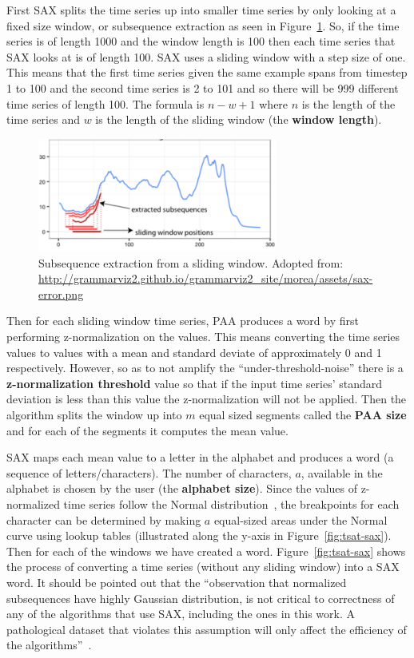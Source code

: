\documentclass[letterpaper, 12pt]{article}
\begin{document}
First SAX splits the time series up into smaller time series by only looking at a fixed size window, or subsequence extraction as seen in Figure~\ref{fig:tsat-slidingwindow}.  So, if the time series is of length 1000 and the window length is 100 then each time series that SAX looks at is of length 100.  SAX uses a sliding window with a step size of one.  This means that the first time series given the same example spans from timestep 1 to 100 and the second time series is 2 to 101 and so there will be 999 different time series of length 100.  The formula is \(n - w + 1\) where \(n\) is the length of the time series and \(w\) is the length of the sliding window (the \textbf{window length}).

\begin{figure}[H]
	\centering
	\includegraphics[width=0.7\textwidth]{pictures/TSAT-slidingwindow}
	\caption{Subsequence extraction from a sliding window.  Adopted from:\\ \url{http://grammarviz2.github.io/grammarviz2_site/morea/assets/sax-error.png}}
	\label{fig:tsat-slidingwindow}
\end{figure}


Then for each sliding window time series, PAA produces a word by first performing z-normalization on the values.  This means converting the time series values to values with a mean and standard deviate of approximately 0 and 1 respectively.  However, so as to not amplify the ``under-threshold-noise'' there is a \textbf{z-normalization threshold} value so that if the input time series' standard deviation is less than this value the z-normalization will not be applied. Then the algorithm splits the window up into \(m\) equal sized segments called the \textbf{PAA size} and for each of the segments it computes the mean value.  

SAX maps each mean value to a letter in the alphabet and produces a word (a sequence of letters/characters).  The number of characters, \(a\), available in the alphabet is chosen by the user (the \textbf{alphabet size}).  Since the values of z-normalized time series follow the Normal distribution~\cite{lin2003symbolic}, the breakpoints for each character can be determined by making \(a\) equal-sized areas under the Normal curve using lookup tables (illustrated along the y-axis in Figure~\ref{fig:tsat-sax}). Then for each of the windows we have created a word.  Figure~\ref{fig:tsat-sax} shows the process of converting a time series (without any sliding window) into a SAX word.  It should be pointed out that the ``observation that normalized subsequences have highly Gaussian distribution, is not critical to correctness of any of the algorithms that use SAX, including the ones in this work. A pathological dataset that violates this assumption will only affect the efficiency of the algorithms''~\cite{keogh2004hot}.
\end{document}
